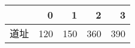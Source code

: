 \begin{tabular}{lrrrr}
\toprule
{} &    0 &    1 &    2 &    3 \\
\midrule
道址 &  120 &  150 &  360 &  390 \\
\bottomrule
\end{tabular}
